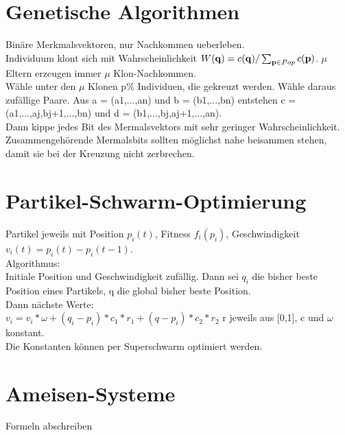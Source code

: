 \documentclass[]{scrartcl}
\begin{document}
\section{Genetische Algorithmen}
Binäre Merkmalsvektoren, nur Nachkommen ueberleben.\\
Individuum klont sich mit Wahrscheinlichkeit $ W({\bf q}) = c({\bf q}) / \sum_{{\bf p} \in Pop} c({\bf p}) $. $ \mu $ Eltern erzeugen immer $ \mu $ Klon-Nachkommen.\\
Wähle unter den $ \mu $ Klonen p\% Individuen, die gekreuzt werden. Wähle daraus zufällige Paare. Aus a = (a1,...,an) und b = (b1,...,bn) entstehen c = (a1,...,aj,bj+1,...,bn) und d = (b1,...,bj,aj+1,...,an).\\
Dann kippe jedes Bit des Mermalsvektors mit sehr geringer Wahrscheinlichkeit.\\
Zusammengehörende Mermalsbits sollten möglichst nahe beisammen stehen, damit sie bei der Kreuzung nicht zerbrechen.

\section{Partikel-Schwarm-Optimierung}
Partikel jeweils mit Position $ p_{i}(t) $, Fitness $ f_{i}(p_{i}) $, Geschwindigkeit $ v_{i}(t) = p_{i}(t) - p_{i}(t-1) $.\\
Algorithmus:\\
Initiale Position und Geschwindigkeit zufällig. Dann sei $ q_{i} $ die bisher beste Position eines Partikels, q die global bisher beste Position.\\
Dann nächste Werte:\\
$ v_{i} = v_{i} * \omega + (q_{i} - p_{i}) * c_{1} * r_{1} + (q - p_{i}) * c_{2} * r_{2} $ r jeweils aus [0,1], c und $ \omega $ konstant.\\
Die Konstanten können per Superschwarm optimiert werden.

\section{Ameisen-Systeme}
Formeln abschreiben %
\end{document}
